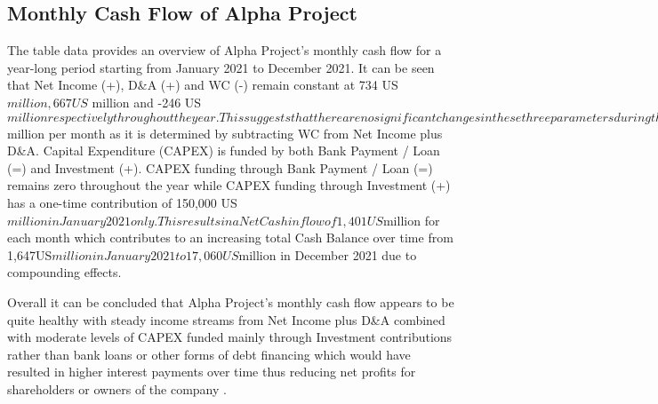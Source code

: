 

\subsection{Monthly Cash Flow of Alpha Project}\label{sec:title}

The table data provides an overview of Alpha Project's monthly cash flow for a year-long period starting from January 2021 to December 2021. It can be seen that Net Income (+), D\&A (+) and WC (-) remain constant at 734 US$ million, 667 US$ million and -246 US$ million respectively throughout the year. This suggests that there are no significant changes in these three parameters during the period studied. 

Operating Cash Flow (OCF) is also fairly stable with 1,401 US$ million per month as it is determined by subtracting WC from Net Income plus D\&A. Capital Expenditure (CAPEX) is funded by both Bank Payment / Loan (=) and Investment (+). CAPEX funding through Bank Payment / Loan (=) remains zero throughout the year while CAPEX funding through Investment (+) has a one-time contribution of 150,000 US$ million in January 2021 only. This results in a Net Cash inflow of 1,401US$million for each month which contributes to an increasing total Cash Balance over time from 1,647US$million in January 2021 to 17,060US$million in December 2021 due to compounding effects. 

Overall it can be concluded that Alpha Project's monthly cash flow appears to be quite healthy with steady income streams from Net Income plus D\&A combined with moderate levels of CAPEX funded mainly through Investment contributions rather than bank loans or other forms of debt financing which would have resulted in higher interest payments over time thus reducing net profits for shareholders or owners of the company .